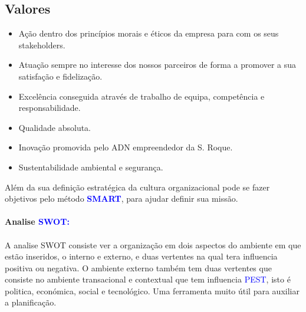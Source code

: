 \subsection{Valores}
\begin{itemize}
\setlength\itemsep{-0.3em}
\item Ação dentro dos princípios morais e éticos da empresa para com os seus stakeholders.
\item Atuação sempre no interesse dos nossos parceiros de forma a promover a sua satisfação e fidelização.
\item Excelência conseguida através de trabalho de equipa, competência e responsabilidade.
\item Qualidade absoluta.
\item Inovação promovida pelo ADN empreendedor da S. Roque.
\item Sustentabilidade ambiental e segurança.
\end{itemize}\par
Além da sua definição estratégica da cultura organizacional pode se fazer objetivos pelo método \textcolor{blue}{\textbf{SMART}}, para ajudar definir sua missão.\\
\\
\qquad \textbf{Analise \textcolor{blue}{SWOT:}}\\
\\
A analise SWOT consiste ver a organização em dois aspectos do ambiente em que estão inseridos, o interno e externo, e duas vertentes na qual tera influencia positiva ou negativa. O ambiente externo também tem duas vertentes que consiste no ambiente transacional e contextual que tem influencia \textcolor{blue}{PEST}, isto é politica, económica, social e tecnológico. Uma ferramenta muito útil para auxiliar a planificação.

